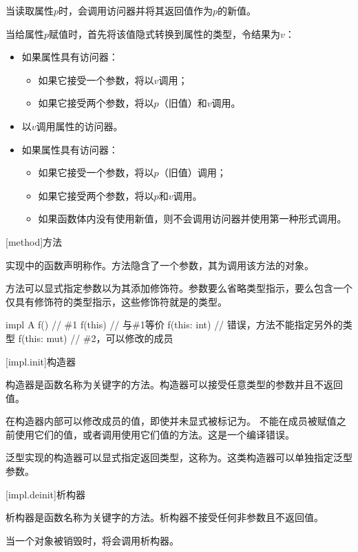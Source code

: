 \pnum
当读取属性$p$时，会调用访问器并将其返回值作为$p$的新值。

\pnum
当给属性$p$赋值时，首先将该值隐式转换到属性的类型，令结果为$v$：

\begin{itemize}
    \item 如果属性具有访问器：
    \begin{itemize}
        \item 如果它接受一个参数，将以$v$调用；
        \item 如果它接受两个参数，将以$p$（旧值）和$v$调用。
    \end{itemize}
    \item 以$v$调用属性的访问器。
    \item 如果属性具有访问器：
    \begin{itemize}
        \item 如果它接受一个参数，将以$p$（旧值）调用；
        \item 如果它接受两个参数，将以$p$和$v$调用。
        \item 如果函数体内没有使用新值，则不会调用访问器并使用第一种形式调用。
    \end{itemize}
\end{itemize}

[method]{方法}

\pnum
实现中的函数声明称作。方法隐含了一个参数，其为调用该方法的对象。

\pnum
方法可以显式指定参数以为其添加修饰符。参数要么省略类型指示，要么包含一个仅具有修饰符的类型指示，这些修饰符就是的类型。

\enterexample
\begin{codeblock}
impl A {
    f() { } // \#1
    f(this) { } // 与\#1等价
    f(this: int) { } // 错误，方法不能指定另外的类型
    f(this: mut) { } // \#2，可以修改的成员
}

\end{codeblock}
\exitexample

[impl.init]{构造器}

\pnum
构造器是函数名称为关键字的方法。构造器可以接受任意类型的参数并且不返回值。

\pnum
在构造器内部可以修改成员的值，即使并未显式被标记为。
不能在成员被赋值之前使用它们的值，或者调用使用它们值的方法。这是一个编译错误。

\pnum
泛型实现的构造器可以显式指定返回类型，这称为。这类构造器可以单独指定泛型参数。

[impl.deinit]{析构器}

\pnum
析构器是函数名称为关键字的方法。析构器不接受任何非参数且不返回值。

\pnum
当一个对象被销毁时，将会调用析构器。